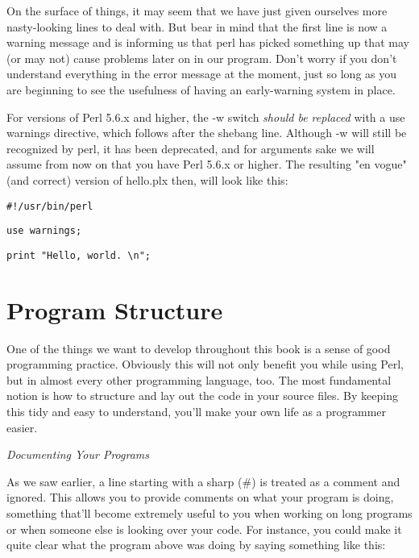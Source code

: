 \documentclass[a4paper,11pt]{book}
\begin{document}
\noindent

\noindent On the surface of things, it may seem that we have just given ourselves more nasty-looking lines to deal with. But bear in mind that the first line is now a warning message and is informing us that perl has picked something up that may (or may not) cause problems later on in our program. Don't worry if you don't understand everything in the error message at the moment, just so long as you are beginning to see the usefulness of having an early-warning system in place.

\noindent 

\noindent For versions of Perl 5.6.x and higher, the -w switch \textit{should be replaced }with a use warnings directive, which follows after the shebang line. Although -w will still be recognized by perl, it has been deprecated, and for arguments sake we will assume from now on that you have Perl 5.6.x or higher. The resulting "en vogue" (and correct) version of hello.plx then, will look like this:

\noindent 

\noindent \texttt{\#!/usr/bin/perl}

\noindent \texttt{use warnings;}

\noindent 

\noindent \texttt{print "Hello, world. \textbackslash n";}

\noindent 

\section{Program Structure}

\noindent 

\noindent One of the things we want to develop throughout this book is a sense of good programming practice. Obviously this will not only benefit you while using Perl, but in almost every other programming language, too. The most fundamental notion is how to structure and lay out the code in your source files. By keeping this tidy and easy to understand, you'll make your own life as a programmer easier.

\noindent 

\noindent \textit{Documenting Your Programs}

\noindent As we saw earlier, a line starting with a sharp (\#) is treated as a comment and ignored. This allows you to provide comments on what your program is doing, something that'll become extremely useful to you when working on long programs or when someone else is looking over your code. For instance, you could make it quite clear what the program above was doing by saying something like this:
\end{document}
